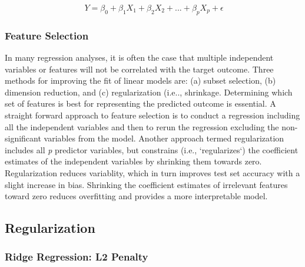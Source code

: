\documentclass[sigconf]{acmart}
\begin{document}
\begin{equation}
  \ Y = \beta_0 + \beta_1X_1 + \beta_2X_2 +... + \beta_pX_p + \epsilon
\end{equation}


\subsubsection{Feature Selection} 

In many regression analyses, it is often the case that multiple independent 
variables or features will not be correlated with the target outcome. Three 
methods for improving the fit of linear models are: (a) subset selection, 
(b) dimension reduction, and (c) regularization (i.e.., shrinkage. Determining 
which set of features is best for representing the predicted outcome is 
essential. A straight forward approach to feature selection is to conduct a 
regression including all the independent variables and then to rerun the 
regression excluding the non-significant variables from the model.
Another approach termed regularization includes all \textit{p} predictor 
variables, but constrains (i.e., `regularizes`) the coefficient estimates of 
the independent variables by shrinking them towards zero. Regularization 
reduces variablity, which in turn improves test set accuracy with a slight 
increase in bias. Shrinking the coefficient estimates of irrelevant features 
toward zero reduces overfitting and provides a more interpretable model. 


\subsection{Regularization} 

\subsubsection{Ridge Regression: L2 Penalty} 
\end{document}
